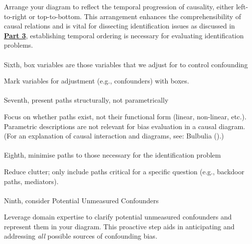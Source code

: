 \documentclass[
  singlecolumn]{article}
\makeatletter
\let\oldparagraph\paragraph
\renewcommand{\paragraph}{
    \@ifstar
      \xxxParagraphStar
      \xxxParagraphNoStar
  }
\newcommand{\xxxParagraphStar}[1]{\oldparagraph*{#1}\mbox{}}
\newcommand{\xxxParagraphNoStar}[1]{\oldparagraph{#1}\mbox{}}
\makeatother
\begin{document}
Arrange your diagram to reflect the temporal progression of causality,
either left-to-right or top-to-bottom. This arrangement enhances the
comprehensibility of causal relations and is vital for dissecting
identification issues as discussed in \hyperref[sec-part3]{\textbf{Part
3}}, establishing temporal ordering is necessary for evaluating
identification problems.

\paragraph{Sixth, box variables are those variables that we adjust for
to control
confounding}\label{sixth-box-variables-are-those-variables-that-we-adjust-for-to-control-confounding}

Mark variables for adjustment (e.g., confounders) with boxes.

\paragraph{Seventh, present paths structurally, not
parametrically}\label{seventh-present-paths-structurally-not-parametrically}

Focus on whether paths exist, not their functional form (linear,
non-linear, etc.). Parametric descriptions are not relevant for bias
evaluation in a causal diagram. (For an explanation of causal
interaction and diagrams, see: Bulbulia
().)

\paragraph{Eighth, minimise paths to those necessary for the
identification
problem}\label{eighth-minimise-paths-to-those-necessary-for-the-identification-problem}

Reduce clutter; only include paths critical for a specific question
(e.g., backdoor paths, mediators).

\paragraph{Ninth, consider Potential Unmeasured
Confounders}\label{ninth-consider-potential-unmeasured-confounders}

Leverage domain expertise to clarify potential unmeasured confounders
and represent them in your diagram. This proactive step aids in
anticipating and addressing \emph{all} possible sources of confounding
bias.
\end{document}
